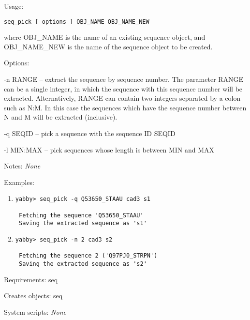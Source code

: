 \begin{description}


\item{Usage:}

{\tt seq\_pick [ options ] OBJ\_NAME OBJ\_NAME\_NEW}

 where OBJ\_NAME is the name of an existing sequence object,
 and OBJ\_NAME\_NEW is the name of the sequence object to
 be created.


\item{Options:}
\begin{description}
\item -n RANGE -- extract the sequence by sequence number. The
 parameter RANGE can be a single integer, in which the
 sequence with this sequence number will be extracted.
 Alternatively, RANGE can contain two integers separated
 by a colon such as N:M. In this case the sequences which
 have the sequence number between N and M will be extracted
 (inclusive).
\item -q SEQID -- pick a sequence with the sequence ID SEQID
\item -l MIN:MAX -- pick sequences whose length is between MIN and MAX
\end{description}


\item{Notes:} {\em None}


\item{Examples:}
\begin{enumerate}

\item
\begin{verbatim}
yabby> seq_pick -q Q53650_STAAU cad3 s1

 Fetching the sequence 'Q53650_STAAU'
 Saving the extracted sequence as 's1'

\end{verbatim}

\item
\begin{verbatim}
yabby> seq_pick -n 2 cad3 s2

 Fetching the sequence 2 ('Q97PJ0_STRPN')
 Saving the extracted sequence as 's2'

\end{verbatim}

\end{enumerate}


\item{Requirements:} seq


\item{Creates objects:} seq


\item{System scripts:} {\em None}

\end{description}

